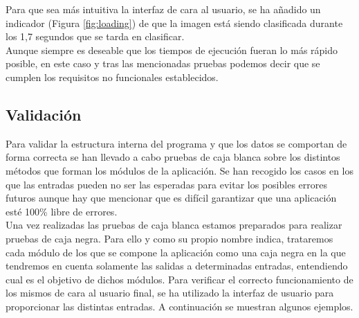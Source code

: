 \documentclass[a4paper,11pt]{book}
\begin{document}
Para que sea más intuitiva la interfaz de cara al usuario, se ha añadido un indicador (Figura \ref{fig:loading}) de que la imagen está siendo clasificada durante los 1,7 segundos que se tarda en clasificar.\\
Aunque siempre es deseable que los tiempos de ejecución fueran lo más rápido posible, en este caso y tras las mencionadas pruebas podemos decir que se cumplen los requisitos no funcionales establecidos.\\








\subsection{Validación}
Para validar la estructura interna del programa y que los datos se comportan de forma correcta se han llevado a cabo pruebas de caja blanca sobre los distintos métodos que forman los módulos de la aplicación. Se han recogido los casos en los que las entradas pueden no ser las esperadas para evitar los posibles errores futuros aunque hay que mencionar que es difícil garantizar que una aplicación esté 100\% libre de errores.\\

Una vez realizadas las pruebas de caja blanca estamos preparados para realizar pruebas de caja negra. Para ello y como su propio nombre indica, trataremos cada módulo de los que se compone la aplicación como una caja negra en la que tendremos en cuenta solamente las salidas a determinadas entradas, entendiendo cual es el objetivo de dichos módulos. Para verificar el correcto funcionamiento de los mismos de cara al usuario final, se ha utilizado la interfaz de usuario para proporcionar las distintas entradas. A continuación se muestran algunos ejemplos.
\end{document}
